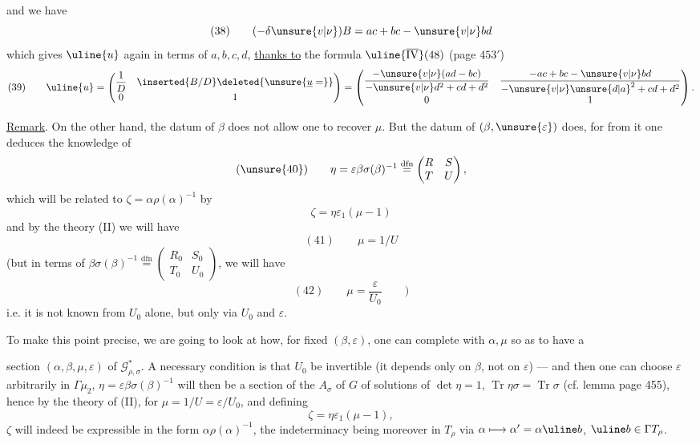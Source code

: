 and we have
\[
(38)\qquad (-\delta\unsure{v|\nu})B=ac+bc-\unsure{v|\nu}bd
\]
which gives $\uline{u}$ again in terms of $a,b,c,d$, \uline{thanks to} the formula $\uline{\overline{\mathrm{IV}}}(48)$ (page $453'$)
\[
(39)\qquad \uline{u}=\begin{pmatrix}\dfrac1D&\inserted{B/D}\deleted{\unsure{\underline u=}}\\0&1\end{pmatrix}
=\begin{pmatrix}
\dfrac{-\unsure{v|\nu}(ad-bc)}{-\unsure{v|\nu}d^2+cd+d^2}&\dfrac{-ac+bc-\unsure{v|\nu}bd}{-\unsure{v|\nu}\unsure{d|a}^2+cd+d^2}\\0&1
\end{pmatrix}.
\]

\uline{Remark}. On the other hand, the datum of $\beta$   does not allow one to recover $\mu$. But the datum of $(\beta,\unsure{\varepsilon})$ does, for from it one deduces the knowledge of
\[
(\unsure{40})\qquad \eta=\varepsilon\beta\sigma(\beta)^{-1}\overset{\mathrm{dfn}}=\begin{pmatrix}R&S\\T&U\end{pmatrix},
\]
which will be related to $\zeta=\alpha\rho(\alpha)^{-1}$ by
\[
\zeta=\eta\varepsilon_1(\mu-1)
\]
and by the theory  (II) we will have
\[
(41)\qquad \mu=1/U
\]
(but in terms of $\beta\sigma(\beta)^{-1}\overset{\mathrm{dfn}}=\begin{pmatrix}R_0&S_0\\T_0&U_0\end{pmatrix}$,
we will have  \unsure{)}
\[
(42)\qquad \mu=\frac{\varepsilon}{U_0}\qquad)
\]
i.e. it is  not known from $U_0$ alone, but only via $U_0$ and $\varepsilon$. 

To make this point precise, we are going to look at  how, for fixed $(\beta,\varepsilon)$, one can complete with $\alpha,\mu$ so as to have a

section $(\alpha,\beta,\mu,\varepsilon)$ of $\mathcal G^{*}_{\rho,\sigma}$. A necessary condition is that $U_0$ be invertible (it depends only on $\beta$, not on $\varepsilon$) --- and then one can choose $\varepsilon$ arbitrarily in $\Gamma\mu_2$,  $\eta=\varepsilon\beta\sigma(\beta)^{-1}$ will then be a section of the  $A_\sigma$  of $G$ of solutions of $\det\eta=1$, $\operatorname{Tr}\eta\sigma=\operatorname{Tr}\sigma$ (cf. lemma page 455), hence by the theory of (II), for  $\mu=1/U=\varepsilon/U_0$,  and defining
\[
\zeta=\eta\varepsilon_1(\mu-1),
\]
$\zeta$ will indeed be expressible  in the form $\alpha\rho(\alpha)^{-1}$, the indeterminacy being moreover in $T_\rho$ via $\alpha\longmapsto\alpha'=\alpha\uline b$, $\uline b\in\Gamma T_\rho$.

